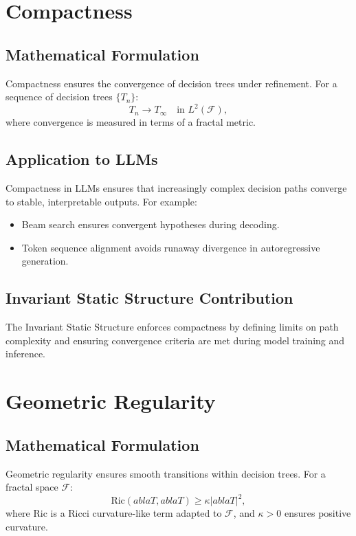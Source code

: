 \section{Compactness}

\subsection{Mathematical Formulation}
Compactness ensures the convergence of decision trees under refinement. For a sequence of decision trees $\{T_n\}$:
\begin{equation}
T_n \to T_\infty \quad \text{in } L^2(\mathcal{F}),
\end{equation}
where convergence is measured in terms of a fractal metric.

\subsection{Application to LLMs}
Compactness in LLMs ensures that increasingly complex decision paths converge to stable, interpretable outputs. For example:
\begin{itemize}
    \item Beam search ensures convergent hypotheses during decoding.
    \item Token sequence alignment avoids runaway divergence in autoregressive generation.
\end{itemize}

\subsection{Invariant Static Structure Contribution}
The Invariant Static Structure enforces compactness by defining limits on path complexity and ensuring convergence criteria are met during model training and inference.

\section{Geometric Regularity}

\subsection{Mathematical Formulation}
Geometric regularity ensures smooth transitions within decision trees. For a fractal space $\mathcal{F}$:
\begin{equation}
\text{Ric}(
abla T,
abla T) \geq \kappa |
abla T|^2,
\end{equation}
where $\text{Ric}$ is a Ricci curvature-like term adapted to $\mathcal{F}$, and $\kappa > 0$ ensures positive curvature.

